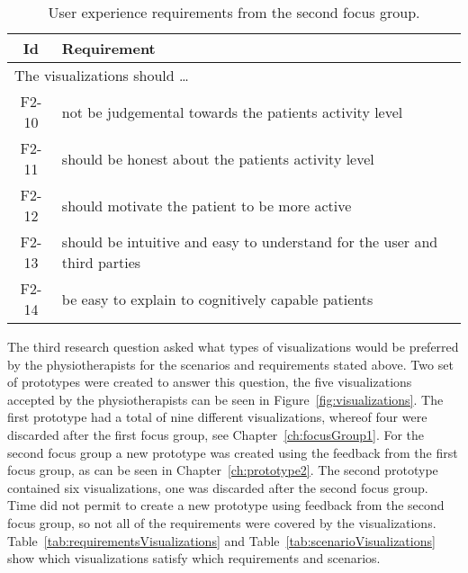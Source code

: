 \begin{table}[h!]
  \begin{center}
  \begin{tabular}{|c|p{12cm}|}
    \hline
      \textbf{Id} & \textbf{Requirement} \\ \hline
    \multicolumn{2}{|l|}{The visualizations should \ldots} \\ \hline
      F2-10 & not be judgemental towards the patients activity level \\ \hline
      F2-11 & should be honest about the patients activity level \\ \hline
      F2-12 & should motivate the patient to be more active \\ \hline
      F2-13 & should be intuitive and easy to understand for the user and third parties \\ \hline
      F2-14 & be easy to explain to cognitively capable patients \\ \hline
  \end{tabular}
  \end{center}
  \caption[Final user experience requirements]{User experience requirements from the second focus group.}
  \label{tab:f2ReqUxCon}
\end{table}

\clearpage

The third research question asked what types of visualizations would be preferred by the physiotherapists for the scenarios and requirements stated above. Two set of prototypes were created to answer this question, the five visualizations accepted by the physiotherapists can be seen in Figure~\ref{fig:visualizations}. The first prototype had a total of nine different visualizations, whereof four were discarded after the first focus group, see Chapter~\ref{ch:focusGroup1}. For the second focus group a new prototype was created using the feedback from the first focus group, as can be seen in Chapter~\ref{ch:prototype2}. The second prototype contained six visualizations, one was discarded after the second focus group. Time did not permit to create a new prototype using feedback from the second focus group, so not all of the requirements were covered by the visualizations. Table~\ref{tab:requirementsVisualizations} and Table~\ref{tab:scenarioVisualizations} show which visualizations satisfy which requirements and scenarios.

